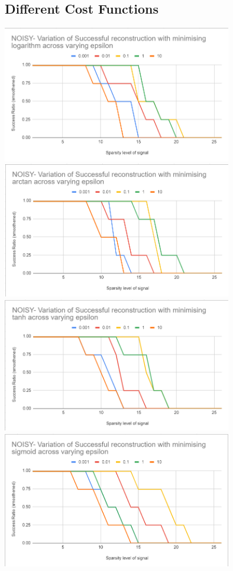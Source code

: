 \documentclass[a4paper,14pt]{article}
\numberwithin{definition}{section}
\numberwithin{mytheorem}{subsection}
\begin{document}
\subsection{Different Cost Functions}

\begin{center}
    \includegraphics[width=10cm]{log_epsilon_noisy.png}
    \includegraphics[width=10cm]{atan_epsilon_noisy.png}
    \includegraphics[width=10cm]{tanh_epsilon_noisy.png}
    \includegraphics[width=10cm]{sigmoid_epsilon_noisy.png}
\end{center}
\end{document}
